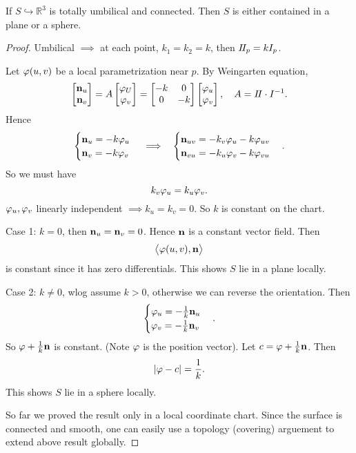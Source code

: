 \begin{theorem}
    If \(S\hookrightarrow\mathbb{R}^3\) is totally umbilical and connected. Then
    \(S\) is either contained in a plane or a sphere.
\end{theorem}
\begin{proof}
    Umbilical \(\implies \) at each point, \(k_1=k_2=k\), then \(I\!I_p=kI_p\).

    Let  \(\varphi(u,v)\) be a local parametrization near \(p\). By Weingarten
    equation, \[
        \begin{bmatrix}
            \vb{n}_u \\ \vb{n}_v
        \end{bmatrix}=A\begin{bmatrix}
            \varphi_U \\ \varphi_v
        \end{bmatrix}=\begin{bmatrix}
            -k & 0 \\
            0 & -k
        \end{bmatrix}\begin{bmatrix}
            \varphi_u \\ \varphi_v
        \end{bmatrix},\quad A=I\!I\cdot I^{-1}
    .\] Hence \[
        \begin{cases}
            \vb{n}_u=-k\varphi_u \\
            \vb{n}_v=-k\varphi_v
        \end{cases}
        \implies\ \ \begin{cases}
            \vb{n}_{uv}=-k_v\varphi_u-k\varphi_{uv} \\
            \vb{n}_{vu}=-k_u\varphi_v-k\varphi_{vu}
        \end{cases}
    .\] So we must have \[
        k_v\varphi_u=k_u\varphi_v
    .\] \(\varphi_u,\varphi_v\) linearly independent \(\implies k_u=k_v=0\). So \(k\)
    is constant on the chart.

    Case 1: \(k=0\), then \(\vb{n}_u=\vb{n}_v=0\). Hence \(\vb{n}\) is a constant
    vector field. Then \[
        \left<\varphi(u,v),\vb{n}\right> 
    \] is constant since it has zero differentials. This shows \(S\) lie in a plane
    locally.

    Case 2: \(k\neq 0\), wlog assume \(k>0\), otherwise we can reverse the
    orientation. Then \[
        \begin{cases}
            \varphi_u=-\frac{1}{k}\vb{n}_u \\
             \varphi_v=-\frac{1}{k}\vb{n}_v
        \end{cases}
    .\] So \(\varphi+\frac{1}{k}\vb{n}\) is constant. (Note \(\varphi\) is the position
    vector). Let \(c=\varphi+\frac{1}{k}\vb{n}\). Then \[
        |\varphi-c|=\frac{1}{k}
    .\] This shows \(S\) lie in a sphere locally.

    So far we proved the result only in a local coordinate chart. Since the surface
    is connected and smooth, one can easily use a topology (covering) arguement
    to extend above result globally.
\end{proof}

